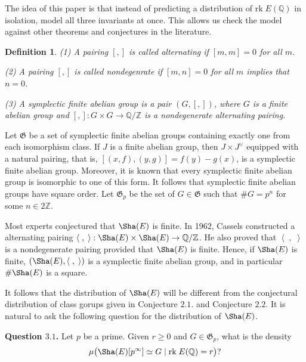 \documentclass[12pt,reqno]{amsart}
\newtheorem{definition}[thm]{Definition}
\numberwithin{equation}{section}
\def\Z{{\mathbb Z}}
\def\Q{{\mathbb Q}}
\def\sG{{\mathfrak G}}
\begin{document}
The idea of this paper is that instead of predicting a distribution of $\text{rk} \; E(\Q)$ in isolation, model all three invariants at once. This allows us check the model against other theorems and conjectures in the literature.


\begin{definition}
{\rm

(1) A pairing $[,]$ is called alternating if $[m, m] = 0$ for all $m$.

\noindent (2) A pairing $[,]$ is called nondegenrate if $[m, n] = 0$ for all $m$ implies that $n=0$.

\noindent (3) A symplectic finite abelian group is a pair $(G, [,])$, where $G$ is a finite abelian group and $[,] : G \times G \to \Q/\Z$ is a nondegenerate alternating pairing.
}
\end{definition}

Let $\sG$ be a set of symplectic finite abelian groups containing exactly one from each isomorphism class. If $J$ is a finite abelian group, then $J \times J^\vee$ equipped with a natural pairing, that is, $[(x,f), (y,g)] = f(y)-g(x)$, is a symplectic finite abelian group. Moreover, it is known that every symplectic finite abelian group is isomorphic to one of this form. It follows that symplectic finite abelian groups have square order.
Let $\sG_p$ be the set of $G \in \sG$ such that $\# G = p^n$ for some $n \in 2\Z$.

\smallskip

Most experts conjectured that $\Sha(E)$ is finite. In 1962, Cassels constructed a alternating pairing $\left\langle \; , \; \right\rangle: \Sha(E) \times \Sha(E) \to \Q/\Z$. He also proved that $\left\langle \; , \; \right\rangle$ is a nondegenerate pairing provided that $\Sha(E)$ is finite. Hence, if $\Sha(E)$ is finite, $(\Sha(E), \left\langle \; , \; \right\rangle)$ is a symplectic finite abelian group, and in particular $\#\Sha(E)$ is a square.

It follows that the distribution of $\Sha(E)$ will be different from the conjectural distribution of class gorups given in {Conjecture $2.1$.} and {Conjecture $2.2$.} It is natural to ask the following question for the distribution of $\Sha(E)$.


\smallskip
{\bf Question $\mathbf{3.1}$.} Let $p$ be a prime. Given $r \ge 0$ and $G \in \sG_p$, what is the density
\begin{align*}
\mu\big(\Sha(E)[p^\infty] \simeq G \; | \; \text{rk} \; E(\Q) = r\big)?
\end{align*}
\smallskip
\end{document}

